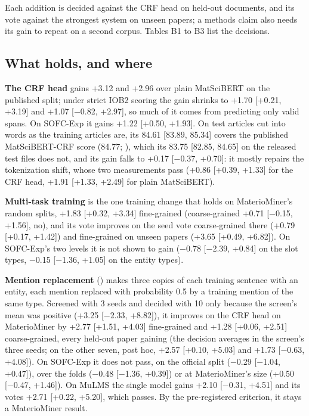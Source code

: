 \documentclass[11pt,a4paper]{article}
\begin{document}
Each addition is decided against the CRF head on held-out documents, and
its vote against the strongest system on unseen papers; a methods claim
also needs its gain to repeat on a second corpus. Tables B1 to B3 list the
decisions.

\hypertarget{what-holds-and-where}{%
\subsection{What holds, and where}\label{what-holds-and-where}}

\textbf{The CRF head} gains +3.12 and +2.96 over plain MatSciBERT on the
published split; under strict IOB2 scoring the gain shrinks to +1.70
{[}+0.21, +3.19{]} and +1.07 {[}−0.82, +2.97{]}, so much of it comes from
predicting only valid spans. On SOFC-Exp it gains +1.22 {[}+0.50, +1.93{]}. On
test articles cut into words as the training articles are, its 84.61
{[}83.89, 85.34{]} covers the published MatSciBERT-CRF score (84.77;
\citealp{gupta2022matscibert}), which its 83.75 {[}82.85, 84.65{]} on the released test
files does not, and its gain falls to +0.17 {[}−0.37, +0.70{]}: it mostly
repairs the tokenization shift, whose two measurements pass (+0.86 {[}+0.39,
+1.33{]} for the CRF head, +1.91 {[}+1.33, +2.49{]} for plain MatSciBERT).

\textbf{Multi-task training} is the one training change that holds on
MaterioMiner's random splits, +1.83 {[}+0.32, +3.34{]} fine-grained
(coarse-grained +0.71 {[}−0.15, +1.56{]}, no), and its vote improves on the
seed vote coarse-grained there (+0.79 {[}+0.17, +1.42{]}) and fine-grained on
unseen papers (+3.65 {[}+0.49, +6.82{]}). On SOFC-Exp's two levels it is not
shown to gain (−0.78 {[}−2.39, +0.84{]} on the slot types, −0.15 {[}−1.36, +1.05{]} on the
entity types).

\textbf{Mention replacement} (\citealp{dai2020analysis}) makes three copies of each
training sentence with an entity, each mention replaced with probability
0.5 by a training mention of the same type. Screened with 3 seeds and
decided with 10 only because the screen's mean was positive (+3.25 {[}−2.33,
+8.82{]}), it improves on the CRF head on MaterioMiner by +2.77 {[}+1.51,
+4.03{]} fine-grained and +1.28 {[}+0.06, +2.51{]} coarse-grained, every
held-out paper gaining (the decision averages in the screen's three seeds;
on the other seven, post hoc, +2.57 {[}+0.10, +5.03{]} and +1.73 {[}−0.63,
+4.08{]}). On SOFC-Exp it does not pass, on the official split (−0.29
{[}−1.04, +0.47{]}), over the folds (−0.48 {[}−1.36, +0.39{]}) or at
MaterioMiner's size (+0.50 {[}−0.47, +1.46{]}). On MuLMS the single model
gains +2.10 {[}−0.31, +4.51{]} and its votes +2.71 {[}+0.22, +5.20{]}, which
passes. By the pre-registered criterion, it stays a MaterioMiner result.
\end{document}
